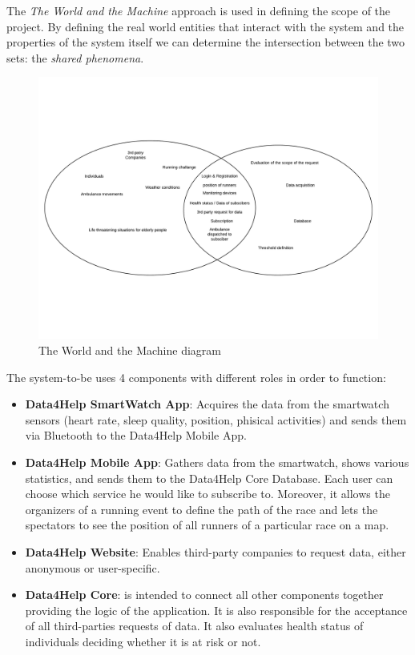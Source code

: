 


The \textit{The World and the Machine} approach is used in defining the scope of the project.
By defining the real world entities that interact with the system and the properties of the system itself we can determine the intersection between the two sets: the \textit{shared phenomena}.

\begin{figure}[H]
	\includegraphics[width=\textwidth,height=\textheight,keepaspectratio]{assets/twatm.pdf}
	\caption{The World and the Machine diagram}
	\label{fig:TWATM}
\end{figure}

The system-to-be uses 4 components with different roles in order to function:
\begin{itemize}
    \item \textbf{Data4Help SmartWatch App}: Acquires the data from the smartwatch sensors (heart rate, sleep quality, position, phisical activities) and sends them via Bluetooth to the Data4Help Mobile App.
    \item \textbf{Data4Help Mobile App}: Gathers data from the smartwatch, shows various statistics, and sends them to the Data4Help Core Database. Each user can choose which service he would like to subscribe to.
    Moreover, it allows the organizers of a running event to define the path of the race and lets the spectators to see the position of all runners of a particular race on a map.
    \item \textbf{Data4Help Website}: Enables third-party companies to request data, either anonymous or user-specific.
    \item \textbf{Data4Help Core}: is intended to connect all other components together providing the logic of the application. It is also responsible for the acceptance of all third-parties requests of data. It also evaluates health status of individuals deciding whether it is at risk or not.
\end{itemize}

